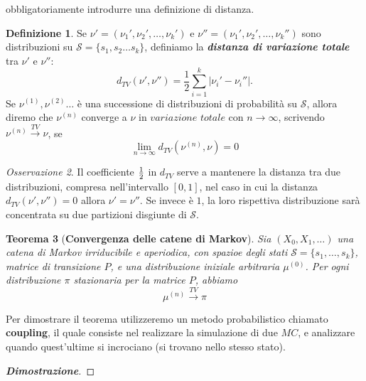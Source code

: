 \documentclass{article}
\newtheorem{theorem}{Teorema}[section]
\theoremstyle{definition}
\theoremstyle{definition}
\newtheorem{definition}[theorem]{Definizione}
\theoremstyle{remark}
\newtheorem{remark}[theorem]{Osservazione}
\begin{document}
obbligatoriamente introdurre una definizione di distanza.
\begin{definition}
    Se $\nu' = (\nu_1',\nu_2',\dots,\nu_k')$ e $\nu'' =(\nu_1',\nu_2',\dots,\nu_k'')$ sono distribuzioni su $\mathcal{S} = \{s_1,s_2\dots s_k\}$, definiamo la \textbf{\textit{distanza di variazione totale}} tra $\nu'$ e $\nu''$:
    $$d_{TV}(\nu',\nu'') = \frac{1}{2}\sum_{i=1}^k|\nu_i'-\nu_i''|.$$
    Se $\nu^{(1)},\nu^{(2)}\dots$ è una successione di distribuzioni di probabilità su $\mathcal{S}$, allora diremo che  $\nu^{(n)}$
    converge a $\nu$ in $variazione$ $totale$ con $n\to \infty$, scrivendo $\nu^{(n)}\xrightarrow{TV}\nu$, se
    $$\lim_{n\to\infty} d_{TV}(\nu^{(n)},\nu) = 0$$
\end{definition}
\begin{remark}
    Il coefficiente $1\over 2$ in $d_{TV}$ serve a mantenere la distanza tra due distribuzioni, compresa nell'intervallo $[0,1]$, nel caso in cui la distanza $d_{TV}(\nu',\nu'')=0$ allora $\nu' = \nu''$. Se invece è $1$, la loro rispettiva distribuzione sarà concentrata su due
    partizioni disgiunte di $\mathcal{S}$.
\end{remark}
\begin{theorem}[\textbf{Convergenza delle catene di Markov}] Sia $(X_0,X_1,\dots)$ una catena di Markov irriducibile e aperiodica, con spazioe degli stati $\mathcal{S}=\{s_1,\dots,s_k\}$,
    matrice di transizione $P$, e una distribuzione iniziale arbitraria $\mu^{(0)}$. Per ogni distribuzione $\pi$ stazionaria per la matrice $P$, abbiamo
    $$\mu^{(n)}\xrightarrow{TV}\pi$$

\end{theorem}
Per dimostrare il teorema utilizzeremo un metodo probabilistico chiamato \textbf{coupling}, il quale consiste nel realizzare la simulazione di due $MC$, e analizzare quando quest'ultime si incrociano (si trovano nello stesso stato).
\begin{proof}[\textbf{Dimostrazione}]

\end{proof}
\end{document}
